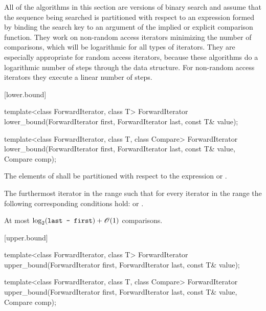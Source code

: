 \pnum
All of the algorithms in this section are versions of binary search
and assume that the sequence being searched is partitioned with respect to
an expression formed by binding the search key to an argument of the
implied or explicit comparison function.
They work on non-random access iterators minimizing the number of comparisons,
which will be logarithmic for all types of iterators.
They are especially appropriate for random access iterators,
because these algorithms do a logarithmic number of steps
through the data structure.
For non-random access iterators they execute a linear number of steps.

[lower.bound]{}

%
\begin{itemdecl}
template<class ForwardIterator, class T>
  ForwardIterator
    lower_bound(ForwardIterator first, ForwardIterator last,
                const T& value);

template<class ForwardIterator, class T, class Compare>
  ForwardIterator
    lower_bound(ForwardIterator first, ForwardIterator last,
                const T& value, Compare comp);
\end{itemdecl}

\begin{itemdescr}
\pnum
\requires
The elements
of
shall be partitioned with respect to the expression
or
.

\pnum
\returns
The furthermost iterator
in the range
such that for every iterator
in the range
the following corresponding conditions hold:
or
.

\pnum
\complexity
At most
$\log_2(\texttt{last - first}) + \mathscr{O}(1)$
comparisons.
\end{itemdescr}

[upper.bound]{}

%
\begin{itemdecl}
template<class ForwardIterator, class T>
  ForwardIterator
    upper_bound(ForwardIterator first, ForwardIterator last,
                const T& value);

template<class ForwardIterator, class T, class Compare>
  ForwardIterator
    upper_bound(ForwardIterator first, ForwardIterator last,
                const T& value, Compare comp);
\end{itemdecl}

